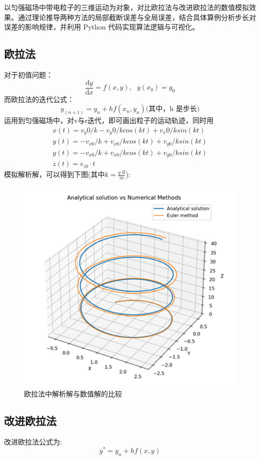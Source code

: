\documentclass[11pt]{article}
\begin{document}
以匀强磁场中带电粒子的三维运动为对象，对比欧拉法与改进欧拉法的数值模拟效果。通过理论推导两种方法的局部截断误差与全局误差，结合具体算例分析步长对误差的影响规律，并利用 Python 代码实现算法逻辑与可视化。

\subsection{欧拉法}
对于初值问题：
\begin{equation*}
    \frac{\mathrm{d}y}{\mathrm{d}x}=f\left(x,y\right),\ \ \  y\left(x_0\right)=y_0
\end{equation*}
而欧拉法的迭代公式：
\begin{equation*}
y_{\left(n+1\right)}=y_n+hf\left(x_n,y_n\right)\mbox{(其中，h 是步长)}
\end{equation*}
运用到匀强磁场中，对v与r迭代，即可画出粒子的运动轨迹，同时用
\begin{equation*}
\begin{gathered}
    x\left(t\right)=v_y0/k-v_y0/kcos{\left(kt\right)}+v_x0/ksin{\left(kt\right)}\\
    y(t)=-v_{x0}/k+v_{x0}/kcos{(kt)}+v_{y0}/ksin{(kt)}\\
    y(t)=-v_{x0}/k+v_{x0}/kcos{(kt)}+v_{y0}/ksin{(kt)}\\
    z\left(t\right)=v_{z0}\cdot t
\end{gathered}
\end{equation*}
模拟解析解，可以得到下图(其中$k=\frac{q\ B}{m}$):
\newpage

\begin{figure}[h!]
    \centering
    \includegraphics[width=0.5\linewidth]{Fig/Euler Method.png}
    \caption{欧拉法中解析解与数值解的比较}
    \label{fig:1}
\end{figure}


\subsection{改进欧拉法}
改进欧拉法公式为:
\begin{equation*}
    y^*=y_n+hf(x,y)
\end{equation*}
\end{document}
